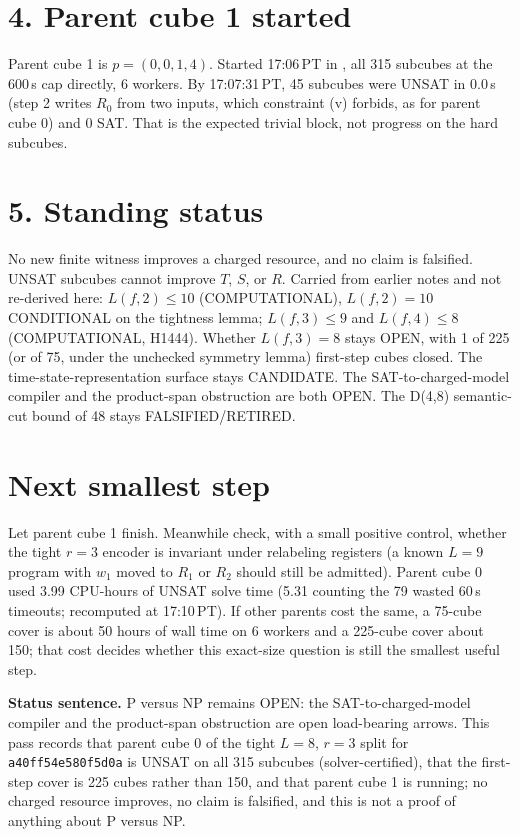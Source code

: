 \documentclass[11pt]{article}
\begin{document}
\section*{4. Parent cube 1 started}
Parent cube 1 is $p=(0,0,1,4)$. Started 17:06\,PT in , all 315 subcubes at the 600\,s cap directly, 6 workers. By 17:07:31\,PT, 45 subcubes were UNSAT in 0.0\,s (step 2 writes $R_0$ from two inputs, which constraint (v) forbids, as for parent cube 0) and 0 SAT. That is the expected trivial block, not progress on the hard subcubes.

\section*{5. Standing status}
No new finite witness improves a charged resource, and no claim is falsified. UNSAT subcubes cannot improve $T$, $S$, or $R$. Carried from earlier notes and not re-derived here: $L(f,2)\le 10$ (COMPUTATIONAL), $L(f,2)=10$ CONDITIONAL on the tightness lemma; $L(f,3)\le 9$ and $L(f,4)\le 8$ (COMPUTATIONAL, H1444). Whether $L(f,3)=8$ stays OPEN, with 1 of 225 (or of 75, under the unchecked symmetry lemma) first-step cubes closed. The time-state-representation surface stays CANDIDATE. The SAT-to-charged-model compiler and the product-span obstruction are both OPEN. The D(4,8) semantic-cut bound of 48 stays FALSIFIED/RETIRED.

\section*{Next smallest step}
Let parent cube 1 finish. Meanwhile check, with a small positive control, whether the tight $r=3$ encoder is invariant under relabeling registers (a known $L=9$ program with $w_1$ moved to $R_1$ or $R_2$ should still be admitted). Parent cube 0 used 3.99 CPU-hours of UNSAT solve time (5.31 counting the 79 wasted 60\,s timeouts; recomputed at 17:10\,PT). If other parents cost the same, a 75-cube cover is about 50 hours of wall time on 6 workers and a 225-cube cover about 150; that cost decides whether this exact-size question is still the smallest useful step.

\bigskip
\noindent\textbf{Status sentence.} P versus NP remains OPEN: the SAT-to-charged-model compiler and the product-span obstruction are open load-bearing arrows. This pass records that parent cube 0 of the tight $L=8$, $r=3$ split for \texttt{a40ff54e580f5d0a} is UNSAT on all 315 subcubes (solver-certified), that the first-step cover is 225 cubes rather than 150, and that parent cube 1 is running; no charged resource improves, no claim is falsified, and this is not a proof of anything about P versus NP.
\end{document}

